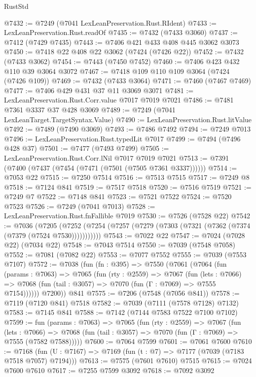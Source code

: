 \begin{lexlean}{RustStd}
\begin{coremodule}
{\begin{coremodule}
{{{{{{{{{{{{{{{{{{{{{{{{{{{{{{{{@7432 := @7249 (@7041 LexLeanPreservation.Rust.RIdent)
@7433 := LexLeanPreservation.Rust.readOf
@7435 := @7432 (@7433 @3060)
@7437 := @7412 (@7429 @7435)
@7443 := @7406 @421 @433 @408 @445 @3062 @3073
@7450 := @7418 @22 @408 @22 @3062 (@7424 (@7426 @22))
@7452 := @7432 (@7433 @3062)
@7454 := @7443 (@7450 @7452)
@7460 := @7406 @423 @432 @110 @39 @3064 @3072
@7467 := @7418 @109 @110 @109 @3064 (@7424 (@7426 @109))
@7469 := @7432 (@7433 @3064)
@7471 := @7460 (@7467 @7469)
@7477 := @7406 @429 @431 @37 @11 @3069 @3071
@7481 := LexLeanPreservation.Rust.Corr.value @7017 @7019 @7021
@7486 := @7481 @7361 @3337 @37 @428 @3069
@7489 := @7249 (@7041 LexLeanTarget.TargetSyntax.Value)
@7490 := LexLeanPreservation.Rust.litValue
@7492 := @7489 (@7490 @3069)
@7493 := @7486 @7492
@7494 := @7249 @7013
@7496 := LexLeanPreservation.Rust.typedLit @7017
@7499 := @7494 (@7496 @428 @37)
@7501 := @7477 (@7493 @7499)
@7505 := LexLeanPreservation.Rust.Corr.lNil @7017 @7019 @7021
@7513 := @7391 (@7400 (@7437 (@7454 (@7471 (@7501 (@7505 @7361 @3337))))))
@7514 := @7053 @22
@7515 := @7250 @7514
@7516 := @7513 @7515
@7517 := @7249 @8
@7518 := @7124 @841
@7519 := @7517 @7518
@7520 := @7516 @7519
@7521 := @7249 @7
@7522 := @7148 @841
@7523 := @7521 @7522
@7524 := @7520 @7523
@7526 := @7249 (@7041 @7013)
@7528 := LexLeanPreservation.Rust.fnFallible @7019
@7530 := @7526 (@7528 @22)
@7542 := @7036
    (@7205 (@7252 (@7254 (@7257 (@7279 (@7303 (@7321 (@7362 (@7374 (@7379 (@7524 @7530)))))))))))
@7543 := @7022 @22
@7547 := @7024 (@7028 @22) (@7034 @22)
@7548 := @7043 @7514
@7550 := @7039 (@7548 @7058)
@7552 := @7081 (@7082 @22)
@7553 := @7077 @7552
@7555 := @7039 (@7553 @7107)
@7572 := @7038
    (fun (fn : @395) =>
    @7550
      (@7061
        (@7064
          (fun (params : @7063) =>
          @7065
            (fun (rty : @2559) =>
            @7067
              (fun (lets : @7066) =>
              @7068 (fun (tail : @3057) => @7070 (fun (Γ : @7069) => @7555 @7154))))))
        @7200))
    @841
@7575 := @7206 (@7548 (@7056 @841))
@7578 := @7119 (@7120 @841) @7518
@7582 := @7039 (@7111 (@7578 @7128) @7132)
@7583 := @7145 @841
@7588 := @7142 (@7144 @7583 @7522 @7100 @7102)
@7599 := fun (params : @7063) =>
  @7065
    (fun (rty : @2559) =>
    @7067
      (fun (lets : @7066) =>
      @7068 (fun (tail : @3057) => @7070 (fun (Γ : @7069) => @7555 (@7582 @7588)))))
@7600 := @7064 @7599
@7601 := @7061 @7600
@7610 := @7168 (fun (U : @7167) => @7169 (fun (t : @7) => @7177 (@7039 (@7183 @7518 @7057) @7194)))
@7613 := @7575 (@7601 @7610) @7515
@7615 := @7024 @7600 @7610
@7617 := @7255 @7599 @3092
@7618 := @7092 @3092
}}}}}}}}}}}}}}}}}}}}}}}}}}}}}}}}
\end{coremodule}}
\end{coremodule}
\end{lexlean}
